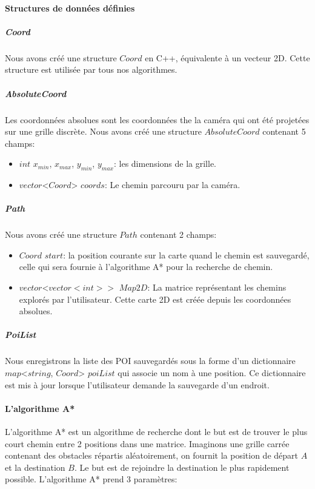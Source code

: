 \documentclass[11pt]{article}
\begin{document}
        \paragraph{Structures de données définies}

          \subparagraph{Coord}
            Nous avons créé une structure $Coord$ en C++, équivalente à un vecteur 2D. Cette structure est utilisée par tous nos algorithmes.
            
          \subparagraph{AbsoluteCoord}
            Les coordonnées absolues sont les coordonnées the la caméra qui ont été projetées sur une grille discrète. Nous avons créé une 
            structure $AbsoluteCoord$ contenant 5 champs:

            \begin{itemize}
              \item $int$ $x_{min}$, $x_{max}$, $y_{min}$, $y_{max}$: les dimensions de la grille.
              \item $vector$<$Coord$> $coords$: Le chemin parcouru par la caméra.          
            \end{itemize}    

          \subparagraph{Path}        
            Nous avons créé une structure $Path$ contenant 2 champs: 
            \begin{itemize}
              \item $Coord$ $start$: la position courante sur la carte quand le chemin est sauvegardé, celle qui sera fournie à l'algorithme
              A* pour la recherche de chemin.
              \item $vector$<$vector<int>>$ $Map2D$: La matrice représentant les chemins explorés par l'utilisateur. Cette carte 2D est créée 
              depuis les coordonnées absolues.     
            \end{itemize} 

          \subparagraph{PoiList}   
            Nous enregistrons la liste des POI sauvegardés sous la forme d'un dictionnaire $map$<$string$, $Coord$> $poiList$ qui associe
            un nom à une position. Ce dictionnaire est mis à jour lorsque l'utilisateur demande la sauvegarde d'un endroit.            

        \paragraph{L'algorithme A*}
          L'algorithme A* est un algorithme de recherche dont le but est de trouver le plus court chemin entre 2 positions dans une matrice.
          Imaginons une grille carrée contenant des obstacles répartis aléatoirement, on fournit la position de départ $A$ et la destination $B$.
          Le but est de rejoindre la destination le plus rapidement possible.
          L'algorithme A* prend 3 paramètres:
\end{document}
